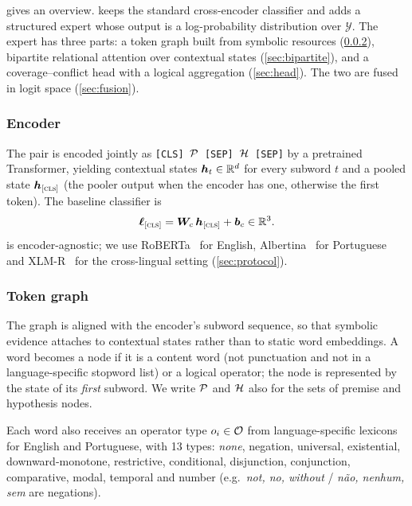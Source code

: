  gives an overview. \model{} keeps the standard cross-encoder classifier and
adds a structured expert whose output is a log-probability distribution over $\mathcal{Y}$. The expert
has three parts: a token graph built from symbolic resources (\cref{sec:graph}), bipartite relational
attention over contextual states (\cref{sec:bipartite}), and a coverage--conflict head with a logical
aggregation (\cref{sec:head}). The two are fused in logit space (\cref{sec:fusion}).

\subsubsection{Encoder}
\label{sec:encoder}

The pair is encoded jointly as \texttt{[CLS]}~$\mathcal{P}$~\texttt{[SEP]}~$\mathcal{H}$~\texttt{[SEP]} by a
pretrained Transformer, yielding contextual states $\bm{h}_t\in\mathbb{R}^{d}$ for every subword $t$
and a pooled state $\bm{h}_{\textsc{[cls]}}$ (the pooler output when the encoder has one, otherwise the first
token). The baseline classifier is
\begin{equation}
  \bm{\ell}_{\textsc{[cls]}} = \bm{W}_c\,\bm{h}_{\textsc{[cls]}} + \bm{b}_c \in \mathbb{R}^{3}.
  \label{eq:cls}
\end{equation}
\model{} is encoder-agnostic; we use RoBERTa~\citep{liu2019roberta} for English,
Albertina~\citep{rodrigues2023albertina} for Portuguese and XLM-R~\citep{conneau2020unsupervised} for the
cross-lingual setting (\cref{sec:protocol}).

\subsubsection{Token graph}
\label{sec:graph}

The graph is aligned with the encoder's subword sequence, so that symbolic evidence attaches to
contextual states rather than to static word embeddings. A word becomes a node if it is a content word
(not punctuation and not in a language-specific stopword list) or a logical operator; the node is
represented by the state of its \emph{first} subword. We write $\mathcal{P}$ and $\mathcal{H}$ also for the sets of
premise and hypothesis nodes.

Each word also receives an operator type $o_i\in\mathcal{O}$ from language-specific lexicons for English and
Portuguese, with 13 types: \emph{none}, negation, universal, existential, downward-monotone, restrictive,
conditional, disjunction, conjunction, comparative, modal, temporal and number (e.g.\ \textit{not, no, without} / \textit{não,
nenhum, sem} are negations).

